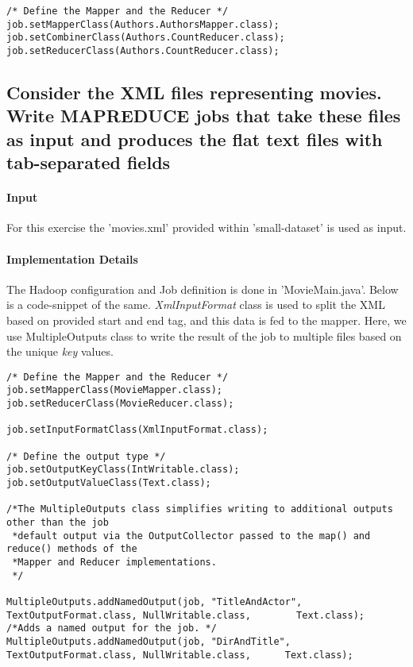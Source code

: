\documentclass[a4paper,10pt]{article}
\begin{document}
\lstset{language=Java}
\begin{lstlisting}
/* Define the Mapper and the Reducer */
job.setMapperClass(Authors.AuthorsMapper.class);
job.setCombinerClass(Authors.CountReducer.class);
job.setReducerClass(Authors.CountReducer.class);
\end{lstlisting}

\subsection{Consider the XML files representing movies. Write MAPREDUCE jobs that take these files as input and produces the flat text files with tab-separated fields}
\paragraph{Input}
For this exercise the 'movies.xml' provided within 'small-dataset' is used as input.

\paragraph{Implementation Details}
The Hadoop configuration and Job definition is done in 'MovieMain.java'. Below is a code-snippet of the same.
\emph{XmlInputFormat} class is used to split the XML based on provided start and end tag, and this data is fed to the mapper. Here, we use MultipleOutputs class to write the result of the job to multiple files based on the unique \emph{key} values.
\begin{lstlisting}
/* Define the Mapper and the Reducer */
job.setMapperClass(MovieMapper.class);
job.setReducerClass(MovieReducer.class);

job.setInputFormatClass(XmlInputFormat.class);
	
/* Define the output type */
job.setOutputKeyClass(IntWritable.class);
job.setOutputValueClass(Text.class);
	
/*The MultipleOutputs class simplifies writing to additional outputs other than the job
 *default output via the OutputCollector passed to the map() and reduce() methods of the 
 *Mapper and Reducer implementations.
 */
	
MultipleOutputs.addNamedOutput(job, "TitleAndActor", TextOutputFormat.class, NullWritable.class, 		Text.class);
/*Adds a named output for the job. */
MultipleOutputs.addNamedOutput(job, "DirAndTitle", TextOutputFormat.class, NullWritable.class,     	Text.class);
\end{lstlisting}
\end{document}
